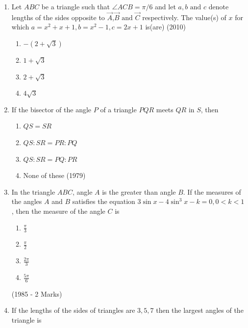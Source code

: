 \begin{enumerate}[label=\thesubsection.\arabic*,ref=\thesubsection.\theenumi]
\begin{enumerate}
    \end{enumerate}
    \item Let $ABC$ be a triangle such that $\angle ACB = \pi/6$ and let $a,b \text{ and } c$ denote lengths of the sides opposite to $\vec{A}$,$\vec{B} \text{ and } \vec{C}$ respectively. The value(s) of $x$ for which $a = x^{2}+x+1, b = x^{2}-1, c = 2x+1$ is(are)
    \hfill{(2010)}
    \begin{multicols}{2}
    	\begin{enumerate}
    		\item $-(2+\sqrt{3})$
    		\item $1+\sqrt{3}$
    		\item $2+\sqrt{3}$
    		\item $4\sqrt{3}$
    	\end{enumerate}
    \end{multicols}
    \item If the bisector of the angle $P$ of a triangle $PQR$ meets $QR$ in $S$, then
\begin{multicols}{4}
    \begin{enumerate}
        \item $QS = SR$
        \item $QS : SR = PR : PQ$
        \item $QS : SR = PQ : PR$
        \item None of these \hfill (1979)
    \end{enumerate}
\end{multicols}
    \item In the triangle $ABC$, angle $A$ is the greater than angle $B$. If the measures of the angles $A$ and $B$ satisfies the equation $3\sin x - 4 \sin^3 x - k = 0, 0<k<1$ , then the measure of the angle $C$ is 
	    \begin{multicols}{2}
	    \begin{enumerate}
     \item $\frac{\pi}{3}$
     \item $\frac{\pi}{2}$
     \item $\frac{2\pi}{3}$
     \item $\frac{5\pi}{6}$ 
\end{enumerate}
	    \end{multicols}
		\hfill (1985 - 2 Marks)
    \item If the lengths of the sides of triangles are $3,5,7$ then the largest angles of the triangle is
	    \begin{multicols}{2}
	    \begin{enumerate}

\end{enumerate}
\end{multicols}
\end{enumerate}
